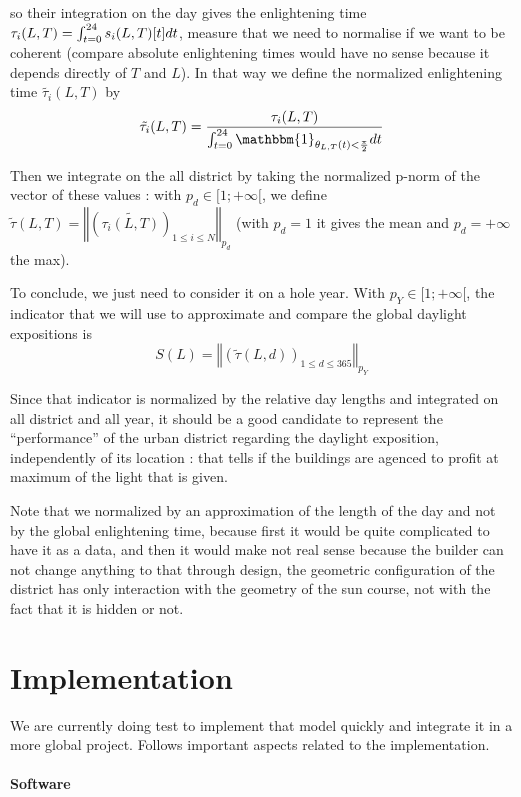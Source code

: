 \documentclass[english]{article}
\begin{document}
so their integration on the day gives the enlightening time $\tau_{i}(L,T)=\intop_{t=0}^{24}s_{i}(L,T)[t]dt$,
measure that we need to normalise if we want to be coherent (compare
absolute enlightening times would have no sense because it depends
directly of $T$ and $L$). In that way we define the normalized enlightening
time $\tilde{\tau_{i}}(L,T)$ by \[\tilde{\tau_{i}}(L,T)=\frac{\tau_{i}(L,T)}{\intop_{t=0}^{24}\mathbbm{1}_{\theta_{L,T}(t)<\frac{\pi}{2}}dt}\]

Then we integrate on the all district by taking the normalized p-norm
of the vector of these values : with $ $$p_{d}\in[1;+\infty[$, we
define $\tilde{\tau}(L,T)=\left\Vert (\tilde{\tau_{i}(L,T)})_{1\leq i\leq N}\right\Vert _{p_{d}}$
(with $p_{d}=1$ it gives the mean and $p_{d}=+\infty$ the max).

To conclude, we just need to consider it on a hole year. With $p_{Y}\in[1;+\infty[$,
the indicator that we will use to approximate and compare the global
daylight expositions is
\[
S(L)=\left\Vert (\tilde{\tau}(L,d))_{1\leq d\leq365}\right\Vert _{p_{Y}}
\]


Since that indicator is normalized by the relative day lengths and
integrated on all district and all year, it should be a good candidate
to represent the ``performance'' of the urban district regarding
the daylight exposition, independently of its location : that tells
if the buildings are agenced to profit at maximum of the light that
is given.

Note that we normalized by an approximation of the length of the day
and not by the global enlightening time, because first it would be
quite complicated to have it as a data, and then it would make not
real sense because the builder can not change anything to that through
design, the geometric configuration of the district has only interaction
with the geometry of the sun course, not with the fact that it is
hidden or not.


\section*{Implementation}

We are currently doing test to implement that model quickly and integrate
it in a more global project. Follows important aspects related to
the implementation.


\paragraph*{Software}
\end{document}
